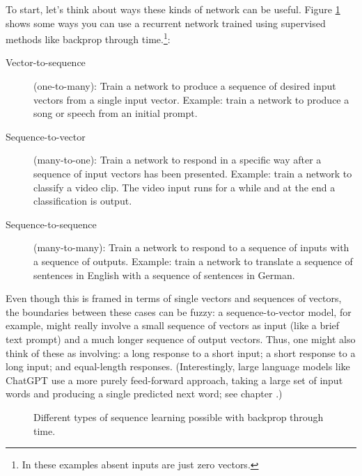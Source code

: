 To start, let's think about ways these kinds of network can be useful. Figure \ref{rnn_schema} shows some ways you can use a recurrent network trained using supervised methods like backprop through time.\footnote{In these examples absent inputs are just zero vectors.}:
\begin{description}
\item[Vector-to-sequence] (one-to-many):  Train a network to produce a sequence of desired input vectors from a single input vector. Example: train a network to produce a song or speech from an initial prompt.
\item[Sequence-to-vector] (many-to-one): Train a network to respond in a specific way after a sequence of input vectors has been presented. Example: train a network to classify a video clip. The video input runs for a while and at the end a classification is output.
\item[Sequence-to-sequence] (many-to-many): Train a network to respond to a sequence of inputs with a sequence of outputs. Example: train a network to translate a sequence of sentences in English with a sequence of sentences in German.
\end{description}
Even though this is framed in terms of single vectors and sequences of vectors, the boundaries between these cases can be fuzzy: a sequence-to-vector model, for example, might really involve a small sequence of vectors as input (like a brief text prompt) and a much longer sequence of output vectors. Thus, one might also think of these as involving: a long response to a short input; a short response to a long input; and equal-length responses. (Interestingly, large language models like ChatGPT use a more purely feed-forward approach, taking a large set of input words and producing a single predicted next word; see chapter .)

\begin{figure}[h]
\centering
{}
\caption[Adapted from Karpathy, 2015 \cite{karpathy2015unreasonable}.]{Different types of sequence learning possible with backprop through time.}
\label{rnn_schema}
\end{figure}

